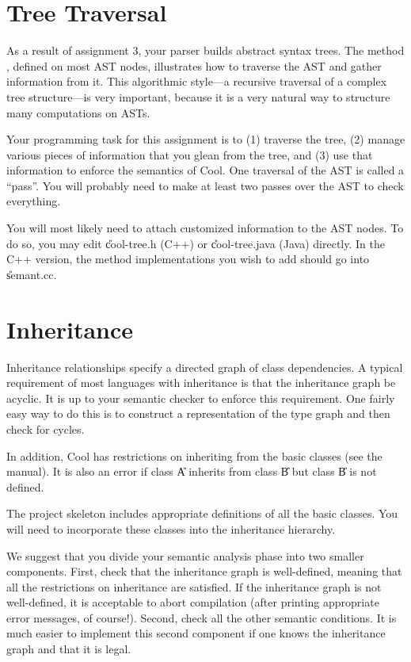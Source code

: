 \documentclass[11pt]{article}
\begin{document}
\section{Tree Traversal}

As a result of assignment 3, your parser builds abstract syntax trees.
The method , defined on most AST nodes, illustrates
how to traverse the AST and gather information from it. This algorithmic
style---a recursive traversal of a complex tree structure---is very
important, because it is a very natural way to structure many
computations on ASTs.

Your programming task for this assignment is to (1) traverse the tree, (2)
manage various pieces of information that you glean from the tree, and
(3) use that information to enforce the semantics of Cool.  One traversal
of the AST is called a ``pass''.  You will probably need to make at
least two passes over the AST to check everything.

You will most likely need to attach customized information to the AST
nodes.  To do so, you may edit \U{cool-tree.h} (C++) or
\U{cool-tree.java} (Java) directly.  In the C++ version, the method
implementations you wish to add should go into \U{semant.cc}.

\section{Inheritance}

Inheritance relationships specify a directed graph of class
dependencies.  A typical requirement of most languages with inheritance
is that the inheritance graph be acyclic.  It is up to your semantic
checker to enforce this requirement. One fairly easy way to do this is
to construct a representation of the type graph and then check for
cycles.

In addition, Cool has restrictions on inheriting from the basic classes
(see the manual).  It is also an error if class \U{A} inherits from
class \U{B} but class \U{B} is not defined.

The project skeleton includes appropriate definitions of all the basic
classes. You will need to incorporate these classes into the inheritance
hierarchy.

We suggest that you divide your semantic analysis phase into two smaller
components.  First, check that the inheritance graph is well-defined,
meaning that all the restrictions on inheritance are satisfied.  If the
inheritance graph is not well-defined, it is acceptable to abort
compilation (after printing appropriate error messages, of course!).
Second, check all the other semantic conditions.  It is much easier to
implement this second component if one knows the inheritance graph and
that it is legal.
\end{document}
